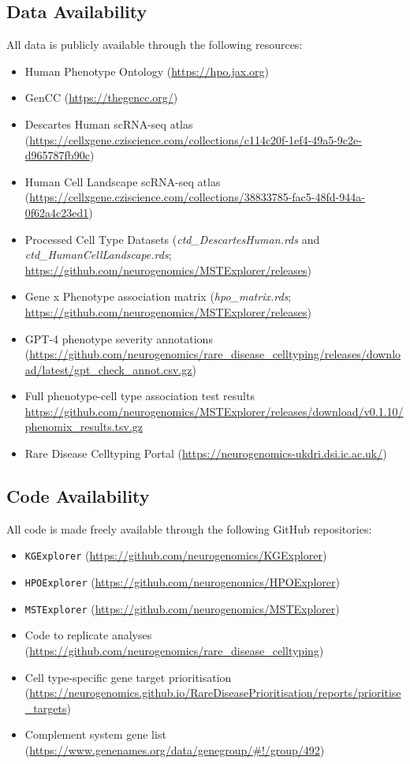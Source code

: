 \documentclass[
]{article}
\providecommand{\tightlist}{%
  \setlength{\itemsep}{0pt}\setlength{\parskip}{0pt}}\usepackage{longtable,booktabs,array}
\begin{document}
\subsection{Data Availability}\label{data-availability}

All data is publicly available through the following resources:

\begin{itemize}
\tightlist
\item
  Human Phenotype Ontology (\url{https://hpo.jax.org})
\item
  GenCC (\url{https://thegencc.org/})
\item
  Descartes Human scRNA-seq atlas
  (\url{https://cellxgene.cziscience.com/collections/c114c20f-1ef4-49a5-9c2e-d965787fb90c})
\item
  Human Cell Landscape scRNA-seq atlas
  (\url{https://cellxgene.cziscience.com/collections/38833785-fac5-48fd-944a-0f62a4c23ed1})
\item
  Processed Cell Type Datasets (\emph{ctd\_DescartesHuman.rds} and
  \emph{ctd\_HumanCellLandscape.rds};
  \url{https://github.com/neurogenomics/MSTExplorer/releases})
\item
  Gene x Phenotype association matrix (\emph{hpo\_matrix.rds};
  \url{https://github.com/neurogenomics/MSTExplorer/releases})
\item
  GPT-4 phenotype severity annotations
  (\url{https://github.com/neurogenomics/rare_disease_celltyping/releases/download/latest/gpt_check_annot.csv.gz})
\item
  Full phenotype-cell type association test results
  \url{https://github.com/neurogenomics/MSTExplorer/releases/download/v0.1.10/phenomix_results.tsv.gz}
\item
  Rare Disease Celltyping Portal
  (\url{https://neurogenomics-ukdri.dsi.ic.ac.uk/})
\end{itemize}

\subsection{Code Availability}\label{code-availability}

All code is made freely available through the following GitHub
repositories:

\begin{itemize}
\tightlist
\item
  \texttt{KGExplorer}
  (\url{https://github.com/neurogenomics/KGExplorer})
\item
  \texttt{HPOExplorer}
  (\url{https://github.com/neurogenomics/HPOExplorer})
\item
  \texttt{MSTExplorer}
  (\url{https://github.com/neurogenomics/MSTExplorer})
\item
  Code to replicate analyses
  (\url{https://github.com/neurogenomics/rare_disease_celltyping})
\item
  Cell type-specific gene target prioritisation
  (\url{https://neurogenomics.github.io/RareDiseasePrioritisation/reports/prioritise_targets})
\item
  Complement system gene list
  (\url{https://www.genenames.org/data/genegroup/\#!/group/492})
\end{itemize}
\end{document}
